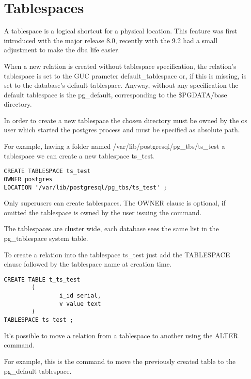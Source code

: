 \section{Tablespaces}
\label{sub:TBS-LOGICAL}
A tablespace is a logical shortcut for a physical location. 
This feature was first introduced with the major release 8.0, recently with the 
9.2 had a small adjustment to make the dba life easier.

When a new relation is created without tablespace specification, the relation's
tablespace is set to the GUC prameter default\_tablespace or, if this is 
missing, is set to the database's default tablespace. 
Anyway, without any specification the default tablespace is the pg\_default, 
corresponding to the \$PGDATA/base directory.

In order to create a new tablespace the chosen directory must be owned by 
the os user which started the postgres process and must be specified as 
absolute path. 

For example, having a folder named /var/lib/postgresql/pg\_tbs/ts\_test a 
tablespace we can create a new tablespace ts\_test.

\begin{lstlisting}[style=pgsql]
CREATE TABLESPACE ts_test 
OWNER postgres
LOCATION '/var/lib/postgresql/pg_tbs/ts_test' ;

\end{lstlisting}

Only superusers can create tablespaces. The OWNER clause is optional, if 
omitted the tablespace is owned by the user issuing the command.

The tablespaces are cluster wide, each database sees the same list in the 
pg\_tablespace system table.

To create a relation into the tablespace ts\_test just add the TABLESPACE 
clause followed by the tablespace name at creation 
time.

\begin{lstlisting}[style=pgsql]
CREATE TABLE t_ts_test
        (
                i_id serial,
                v_value text
        )
TABLESPACE ts_test ;

\end{lstlisting}

It's possible to move a relation from a tablespace to another using the 
ALTER command.

For example, this is the command to move the previously created table to the 
pg\_default tablespace.

